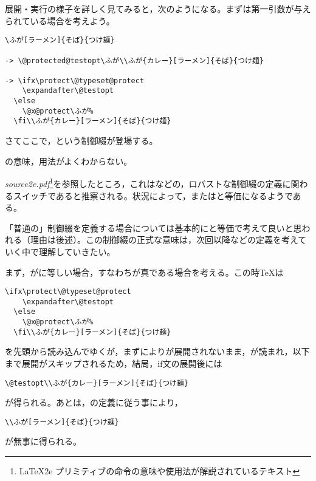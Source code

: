 \documentclass[autodetect-engine,dvipdfmx]{jsarticle}
\begin{document}
展開・実行の様子を詳しく見てみると，次のようになる。まずは第一引数が与えられている場合を考えよう。
\begin{lstlisting}
\ふが[ラーメン]{そば}{つけ麺}

-> \@protected@testopt\ふが\\ふが{カレー}[ラーメン]{そば}{つけ麺}

-> \ifx\protect\@typeset@protect
    \expandafter\@testopt
  \else
    \@x@protect\ふが%
  \fi\\ふが{カレー}[ラーメン]{そば}{つけ麺}
\end{lstlisting}
さてここで，という制御綴が登場する。
\begin{question}
の意味，用法がよくわからない。
\end{question}
\begin{answer}
\textsl{source2e.pdf}\footnote{\LaTeX2e プリミティブの命令の意味や使用法が解説されているテキスト}を参照したところ，これはなどの，ロバストな制御綴の定義に関わるスイッチであると推察される。状況によって，またはと等価になるようである。

「普通の」制御綴を定義する場合については基本的にと等価で考えて良いと思われる（理由は後述）。この制御綴の正式な意味は，次回以降などの定義を考えていく中で理解していきたい。
\end{answer}
まず，がに等しい場合，すなわちが真である場合を考える。この時\TeX は
\begin{lstlisting}
\ifx\protect\@typeset@protect
    \expandafter\@testopt
  \else
    \@x@protect\ふが%
  \fi\\ふが{カレー}[ラーメン]{そば}{つけ麺}
\end{lstlisting}
を先頭から読み込んでゆくが，まずによりが展開されないまま，が読まれ，以下まで展開がスキップされるため，結局，if文の展開後には
\begin{lstlisting}
\@testopt\\ふが{カレー}[ラーメン]{そば}{つけ麺}
\end{lstlisting}
が得られる。あとは，の定義に従う事により，
\begin{lstlisting}
\\ふが[ラーメン]{そば}{つけ麺}
\end{lstlisting}
が無事に得られる。
\end{document}

